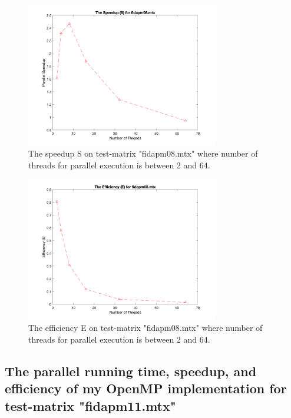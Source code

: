 \documentclass[a4paper,11pt]{article}
\theoremstyle{mytheor}
\begin{document}
\begin{figure}[!htb]
    \centering
    \includegraphics[width=0.75\textwidth]{s1}
    \caption{The speedup S on test-matrix "fidapm08.mtx" where number of threads for parallel execution is between 2 and 64.}
\end{figure}

\begin{figure}[!htb]
    \centering
    \includegraphics[width=0.75\textwidth]{e1}
    \caption{The efficiency E on test-matrix "fidapm08.mtx" where number of threads for parallel execution is between 2 and 64.}
\end{figure}

\FloatBarrier
\subsection{The parallel running time, speedup, and efficiency of my OpenMP implementation for test-matrix "fidapm11.mtx"}
\end{document}

